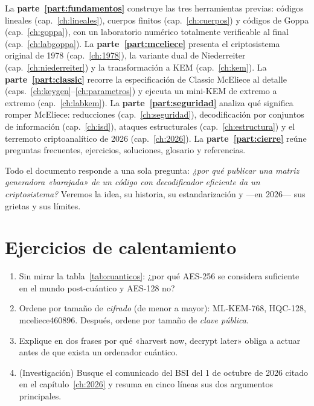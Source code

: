 \documentclass[11pt,a4paper,oneside]{report}
\begin{document}
La \textbf{parte~\ref{part:fundamentos}} construye las tres herramientas
previas: códigos lineales (cap.~\ref{ch:lineales}), cuerpos finitos
(cap.~\ref{ch:cuerpos}) y códigos de Goppa (cap.~\ref{ch:goppa}), con un
laboratorio numérico totalmente verificable al final
(cap.~\ref{ch:labgoppa}). La \textbf{parte~\ref{part:mceliece}} presenta el
criptosistema original de 1978 (cap.~\ref{ch:1978}), la variante dual de
Niederreiter (cap.~\ref{ch:niederreiter}) y la transformación a KEM
(cap.~\ref{ch:kem}). La \textbf{parte~\ref{part:classic}} recorre la
especificación de Classic McEliece al detalle
(caps.~\ref{ch:keygen}--\ref{ch:parametros}) y ejecuta un mini-KEM de
extremo a extremo (cap.~\ref{ch:labkem}). La
\textbf{parte~\ref{part:seguridad}} analiza qué significa romper McEliece:
reducciones (cap.~\ref{ch:seguridad}), decodificación por conjuntos de
información (cap.~\ref{ch:isd}), ataques estructurales
(cap.~\ref{ch:estructura}) y el terremoto criptoanalítico de 2026
(cap.~\ref{ch:2026}). La \textbf{parte~\ref{part:cierre}} reúne preguntas
frecuentes, ejercicios, soluciones, glosario y referencias.

\begin{idea}
Todo el documento responde a una sola pregunta: \emph{¿por qué publicar una
matriz generadora «barajada» de un código con decodificador eficiente da un
criptosistema?} Veremos la idea, su historia, su estandarización y ---en
2026--- sus grietas y sus límites.
\end{idea}

\section{Ejercicios de calentamiento}

\begin{enumerate}[leftmargin=1.6em,itemsep=2pt]
  \item Sin mirar la tabla~\ref{tab:cuanticos}: ¿por qué AES-256 se
        considera suficiente en el mundo post-cuántico y AES-128 no?
  \item Ordene por tamaño de \emph{cifrado} (de menor a mayor):
        ML-KEM-768, HQC-128, mceliece460896. Después, ordene por tamaño de
        \emph{clave pública}.
  \item Explique en dos frases por qué «harvest now, decrypt later» obliga
        a actuar antes de que exista un ordenador cuántico.
  \item \textnormal{(}Investigación\textnormal{)} Busque el comunicado del
        BSI del 1 de octubre de 2026 citado en el
        capítulo~\ref{ch:2026} y resuma en cinco líneas sus dos argumentos
        principales.
\end{enumerate}
\end{document}
